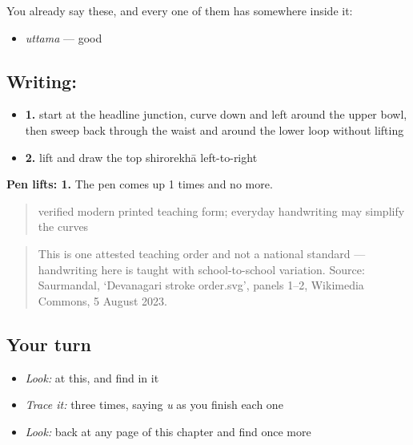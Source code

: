 You already say these, and every one of them has  somewhere inside it:

\begin{itemize}
\raggedright
  \item \textbf{} \emph{uttama} — good
\end{itemize}

\subsection*{Writing: }

\begin{itemize}
\raggedright
  \item \textbf{1.} start at the headline junction, curve down and left around the upper bowl, then sweep back through the waist and around the lower loop without lifting
  \item \textbf{2.} lift and draw the top shirorekhā left-to-right
\end{itemize}

\textbf{Pen lifts: 1.} The pen comes up 1 times and no more.

\begin{quote}
verified modern printed teaching form; everyday handwriting may simplify the curves
\end{quote}

\begin{quote}
This is one attested teaching order and not a national standard — handwriting here is taught with school-to-school variation. Source: Saurmandal, ‘Devanagari  stroke order.svg’, panels 1–2, Wikimedia Commons, 5 August 2023.
\end{quote}

\subsection*{Your turn}
\begin{itemize}
\raggedright
  \item \emph{Look:} at this, and find  in it
\end{itemize}

\begin{quote}
\end{quote}

\begin{itemize}
\raggedright
  \item \emph{Trace it:}  three times, saying \emph{u} as you finish each one
  \item \emph{Look:} back at any page of this chapter and find  once more
\end{itemize}

